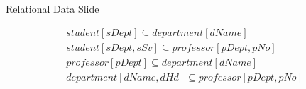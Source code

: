 
\newcommand{\studentDeptInclusionDependency}
{student[sDept] \subseteq department[dName]}
\newcommand{\studentSupervisorInclusionDependency}
{student[sDept,sSv] \subseteq professor[pDept,pNo]}
\newcommand{\professorDeptInclusionDependency}
{professor[pDept] \subseteq department[dName]}
\newcommand{\headOfDeptInclusionDependency}
{department[dName,dHd]  \subseteq professor[pDept,pNo]}

\begin{frame}{Relational Data Slide}

\begin{align*}
\studentDeptInclusionDependency  \\
\studentSupervisorInclusionDependency\\
\professorDeptInclusionDependency\\
\headOfDeptInclusionDependency  \\
\end{align*}
\end{frame}
